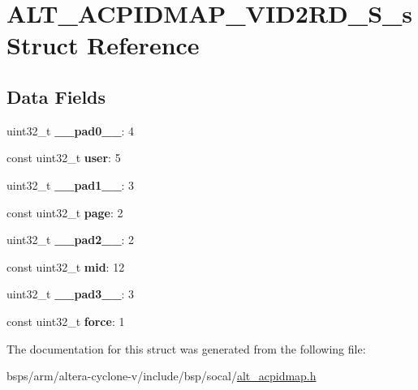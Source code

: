 \hypertarget{structALT__ACPIDMAP__VID2RD__S__s}{}\section{A\+L\+T\+\_\+\+A\+C\+P\+I\+D\+M\+A\+P\+\_\+\+V\+I\+D2\+R\+D\+\_\+\+S\+\_\+s Struct Reference}
\label{structALT__ACPIDMAP__VID2RD__S__s}
\subsection*{Data Fields}
\begin{DoxyCompactItemize}
\item 
\mbox{\label{structALT__ACPIDMAP__VID2RD__S__s_a148cffd528f2970b57db0ef64e44f788}} 
uint32\+\_\+t {\bfseries \+\_\+\+\_\+pad0\+\_\+\+\_\+}\+: 4
\item 
\mbox{\label{structALT__ACPIDMAP__VID2RD__S__s_afbc94cec645accfcc8e3dfb43f699d4c}} 
const uint32\+\_\+t {\bfseries user}\+: 5
\item 
\mbox{\label{structALT__ACPIDMAP__VID2RD__S__s_a2b3975a14489da98d27dca2f1ae9e38e}} 
uint32\+\_\+t {\bfseries \+\_\+\+\_\+pad1\+\_\+\+\_\+}\+: 3
\item 
\mbox{\label{structALT__ACPIDMAP__VID2RD__S__s_aa97e85bc4f09ad56abd0e4c1860de2f5}} 
const uint32\+\_\+t {\bfseries page}\+: 2
\item 
\mbox{\label{structALT__ACPIDMAP__VID2RD__S__s_a994a3dd4e34332ae1dc7185df678b944}} 
uint32\+\_\+t {\bfseries \+\_\+\+\_\+pad2\+\_\+\+\_\+}\+: 2
\item 
\mbox{\label{structALT__ACPIDMAP__VID2RD__S__s_aa9e8a3c82cddf42bbf19161b137729ed}} 
const uint32\+\_\+t {\bfseries mid}\+: 12
\item 
\mbox{\label{structALT__ACPIDMAP__VID2RD__S__s_a3179b94b4dbfa45263971a9e6f1d6e6f}} 
uint32\+\_\+t {\bfseries \+\_\+\+\_\+pad3\+\_\+\+\_\+}\+: 3
\item 
\mbox{\label{structALT__ACPIDMAP__VID2RD__S__s_a57521728e8e54317608b1aee36d566d0}} 
const uint32\+\_\+t {\bfseries force}\+: 1
\end{DoxyCompactItemize}


The documentation for this struct was generated from the following file\+:\begin{DoxyCompactItemize}
\item 
bsps/arm/altera-\/cyclone-\/v/include/bsp/socal/\mbox{\hyperlink{alt__acpidmap_8h}{alt\+\_\+acpidmap.\+h}}\end{DoxyCompactItemize}
